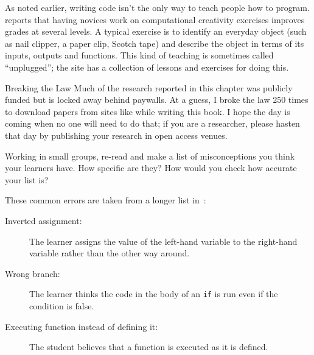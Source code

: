 As noted earlier, writing code isn't the only way to teach people how to program. \cite{Shel2017} reports that having novices work on computational creativity exercises improves grades at several levels. A typical exercise is to identify an everyday object (such as nail clipper, a paper clip, Scotch tape) and describe the object in terms of its inputs, outputs and functions. This kind of teaching is sometimes called ``unplugged''; the  site has a collection of lessons and exercises for doing this.

\begin{aside}{Breaking the Law}
  Much of the research reported in this chapter was publicly funded
  but is locked away behind paywalls.
  At a guess,
  I broke the law 250 times to download papers from sites like 
  while writing this book.
  I hope the day is coming when no one will need to do that;
  if you are a researcher,
  please hasten that day by publishing your research in open access venues.
\end{aside}



Working in small groups,
re-read  and make a list of misconceptions you think your learners have.
How specific are they?
How would you check how accurate your list is?


These common errors are taken from a longer list in~\cite{Sirk2012}:

\begin{description}

\item[Inverted assignment:]
  The learner assigns the value of the left-hand variable to the right-hand variable
  rather than the other way around.

\item[Wrong branch:]
  The learner thinks the code in the body of an \texttt{if} is run
  even if the condition is false.

\item[Executing function instead of defining it:]
  The student believes that a function is executed as it is defined.

\end{description}

